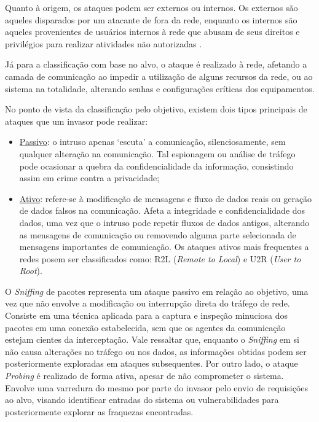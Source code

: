     Quanto à origem, os ataques podem ser externos ou internos. Os externos são aqueles disparados por um atacante de fora da rede, enquanto os internos são aqueles provenientes de usuários internos à rede que abusam de seus direitos e privilégios para realizar atividades não autorizadas \cite{turcato2020}.

    Já para a classificação com base no alvo, o ataque é realizado à rede, afetando a camada de comunicação ao impedir a utilização de alguns recursos da rede, ou ao sistema na totalidade, alterando senhas e configurações críticas dos equipamentos.
    
    No ponto de vista da classificação pelo objetivo, existem dois tipos principais de ataques que um invasor pode realizar:

    \begin{itemize}
        \item \underline{Passivo}: o intruso apenas `escuta' a comunicação, silenciosamente, sem qualquer alteração na comunicação. Tal espionagem ou análise de tráfego pode ocasionar a quebra da confidencialidade da informação, consistindo assim em crime contra a privacidade;
        \item \underline{Ativo}: refere-se à modificação de mensagens e fluxo de dados reais ou geração de dados falsos na comunicação. Afeta a integridade e confidencialidade dos dados, uma vez que o intruso pode repetir fluxos de dados antigos, alterando as mensagens de comunicação ou removendo alguma parte selecionada de mensagens importantes de comunicação. Os ataques ativos mais frequentes a redes posem ser classificados como: R2L (\textit{Remote to Local}) e U2R (\textit{User to Root}).
    \end{itemize}

    O \textit{Sniffing} de pacotes representa um ataque passivo em relação ao objetivo, uma vez que não envolve a modificação ou interrupção direta do tráfego de rede. Consiste em uma técnica aplicada para a captura e inspeção minuciosa dos pacotes em uma conexão estabelecida, sem que os agentes da comunicação estejam cientes da interceptação. Vale ressaltar que, enquanto o \textit{Sniffing} em si não causa alterações no tráfego ou nos dados, as informações obtidas podem ser posteriormente exploradas em ataques subsequentes. Por outro lado, o ataque \textit{Probing} é realizado de forma ativa, apesar de não comprometer o sistema. Envolve uma varredura do mesmo por parte do invasor pelo envio de requisições ao alvo, visando identificar entradas do sistema ou vulnerabilidades para posteriormente explorar as fraquezas encontradas.
    
